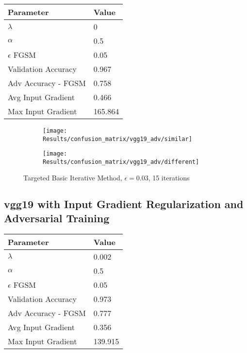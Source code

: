 \documentclass[draft,final]{vutinfth} %
\begin{document}
\begin{table}[h]
  \centering
  \begin{tabular}{ll}
    \toprule
			Parameter			& Value   \\
    \midrule
			$\lambda$								& 0				\\
			$\alpha$								& 0.5			\\
			$\epsilon$ FGSM					& 0.05		\\
			
			Validation Accuracy			& 0.967		\\ 
			Adv Accuracy - FGSM			& 0.758		\\
			
			Avg Input Gradient			& 0.466	\\
			Max Input Gradient			& 165.864\\
    \bottomrule
  \end{tabular}
\end{table}


\begin{figure}[h]
  \begin{subfigure}[b]{0.75\columnwidth}
		\centering
    \texttt{[image: Results/confusion\_matrix/vgg19\_adv/similar]}
    \label{fig:exp:cm:vgg19_adv:similar}
  \end{subfigure}
  \begin{subfigure}[b]{0.75\columnwidth}
		\centering
    \texttt{[image: Results/confusion\_matrix/vgg19\_adv/different]}
    \label{fig:exp:cm:vgg19_adv:different}
  \end{subfigure}
  \caption{Targeted Basic Iterative Method, $\epsilon = 0.03$, 15 iterations}
  \label{fig:exp:cm:vgg19_adv}
\end{figure}

\subsection{vgg19 with Input Gradient Regularization and Adversarial Training}

\begin{table}[h]
  \centering
  \begin{tabular}{ll}
    \toprule
			Parameter			& Value   \\
    \midrule
			$\lambda$								& 0.002				\\
			$\alpha$								& 0.5					\\
			$\epsilon$ FGSM					& 0.05		\\
			
			Validation Accuracy			& 0.973		\\ 
			Adv Accuracy - FGSM			& 0.777		\\
			
			Avg Input Gradient			& 0.356	\\
			Max Input Gradient			& 139.915\\
    \bottomrule
  \end{tabular}
\end{table}
\end{document}
